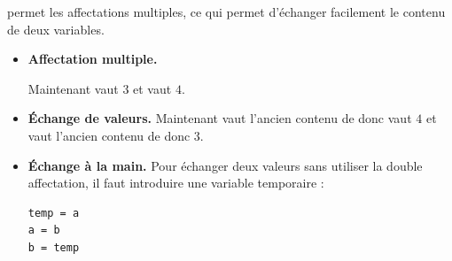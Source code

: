 \documentclass[11pt,class=report,crop=false]{standalone}
\begin{document}

\begin{cours}
\Python{} permet les affectations multiples, ce qui permet d'échanger facilement le contenu de deux variables.
	\begin{itemize}
		\item \textbf{Affectation multiple.} 		
		
		Maintenant  vaut $3$ et  vaut $4$.
		
		\item \textbf{\'Echange de valeurs.}		
		Maintenant  vaut l'ancien contenu de  donc vaut $4$ et  vaut l'ancien contenu de  donc $3$.
		
		\item \textbf{\'Echange à la main.} Pour échanger deux valeurs sans utiliser la double affectation, il faut introduire une variable temporaire :
\begin{center} 
\begin{lstlisting}		
temp = a
a = b
b = temp			
\end{lstlisting}
\end{center}
\end{itemize}
\end{cours}
	


\end{document}
